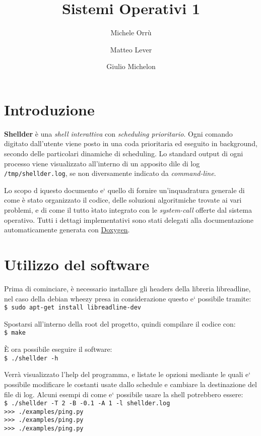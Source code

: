 \documentclass[11pt]{article}
\title{\textbf{Sistemi Operativi 1}}
\author{Michele Orr\`u \and Matteo Lever \and Giulio Michelon}
\date{}
\begin{document}
\newcommand{\code}{\texttt}

\maketitle

\section{Introduzione}

\textbf{Shellder} \`e una \emph{shell interattiva} con \emph{scheduling prioritario}.
Ogni comando digitato dall'utente viene posto in una coda prioritaria ed
eseguito in background, secondo delle particolari dinamiche di scheduling. Lo
standard output di ogni processo viene visualizzato all'interno di un apposito
dile di log \code{/tmp/shellder.log},  se non diversamente indicato da
\emph{command-line}.

Lo scopo d iquesto documento e` quello di fornire un'inquadratura generale di
come \`e stato organizzato il codice, delle soluzioni algoritmiche trovate ai
vari problemi, e di come il tutto \`stato integrato con le \emph{system-call}
offerte dal sistema operativo. Tutti i dettagi implementativi sono stati
delegati alla documentazione automaticamente generata con
\href{http://www.stack.nl/~dimitri/doxygen/}{Doxygen}.

\section{Utilizzo del software}
\label{usage}

Prima di cominciare, \`e necessario installare gli headers della libreria libreadline,
nel caso della debian wheezy presa in considerazione questo e` possibile tramite:
\\ \code{\$ sudo apt-get install libreadline-dev}

\noindent Spostarsi all'interno della root del progetto, quindi compilare il codice con:
\\ \code{\$ make}

\noindent \`E ora possibile eseguire il software:
\\ \code{\$ ./shellder -h}

\noindent Verr\`a visualizzato l'help del programma, e listate le opzioni mediante le quali e`
possibile modificare le costanti usate dallo schedule e cambiare la destinazione del file di log.
Alcuni esempi di come e` possibile usare la shell potrebbero essere:
\\ \code{\$ ./shellder  -T 2  -B -0.1  -A 1  -l shellder.log}
\\ \code{>>> ./examples/ping.py }
\\ \code{>>> ./examples/ping.py }
\\ \code{>>> ./examples/ping.py }
\end{document}
